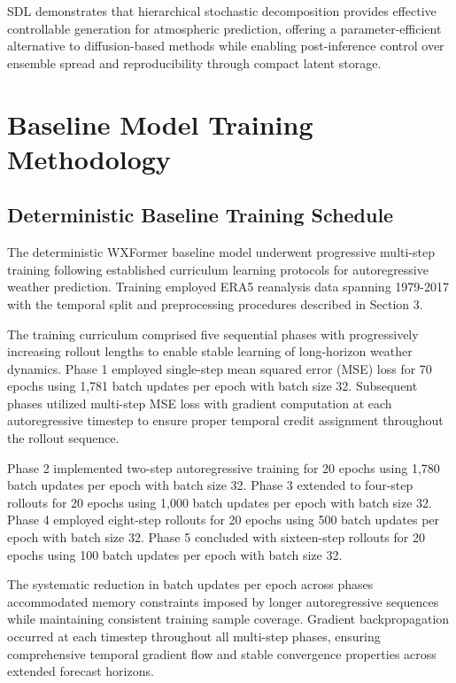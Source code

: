 \documentclass[11pt]{article}
\begin{document}
SDL demonstrates that hierarchical stochastic decomposition provides effective controllable generation for atmospheric prediction, offering a parameter-efficient alternative to diffusion-based methods while enabling post-inference control over ensemble spread and reproducibility through compact latent storage.

\appendix

\section{Baseline Model Training Methodology}
\label{sec:train_details}

\subsection{Deterministic Baseline Training Schedule}

The deterministic WXFormer baseline model underwent progressive multi-step training following established curriculum learning protocols for autoregressive weather prediction. Training employed ERA5 reanalysis data spanning 1979-2017 with the temporal split and preprocessing procedures described in Section 3.

The training curriculum comprised five sequential phases with progressively increasing rollout lengths to enable stable learning of long-horizon weather dynamics. Phase 1 employed single-step mean squared error (MSE) loss for 70 epochs using 1,781 batch updates per epoch with batch size 32. Subsequent phases utilized multi-step MSE loss with gradient computation at each autoregressive timestep to ensure proper temporal credit assignment throughout the rollout sequence.

Phase 2 implemented two-step autoregressive training for 20 epochs using 1,780 batch updates per epoch with batch size 32. Phase 3 extended to four-step rollouts for 20 epochs using 1,000 batch updates per epoch with batch size 32. Phase 4 employed eight-step rollouts for 20 epochs using 500 batch updates per epoch with batch size 32. Phase 5 concluded with sixteen-step rollouts for 20 epochs using 100 batch updates per epoch with batch size 32.

The systematic reduction in batch updates per epoch across phases accommodated memory constraints imposed by longer autoregressive sequences while maintaining consistent training sample coverage. Gradient backpropagation occurred at each timestep throughout all multi-step phases, ensuring comprehensive temporal gradient flow and stable convergence properties across extended forecast horizons.
\end{document}
